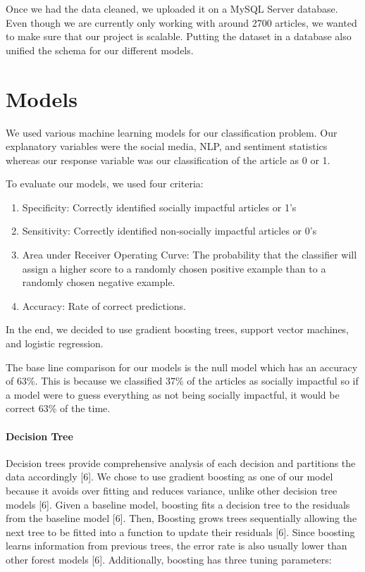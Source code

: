 \documentclass[10pt,letterpaper]{article}
\providecommand{\tightlist}{%
  \setlength{\itemsep}{0pt}\setlength{\parskip}{0pt}}
\begin{document}
Once we had the data cleaned, we uploaded it on a MySQL Server database.
Even though we are currently only working with around 2700 articles, we
wanted to make sure that our project is scalable. Putting the dataset in
a database also unified the schema for our different models.

\hypertarget{models}{%
\section{Models}\label{models}}

We used various machine learning models for our classification problem.
Our explanatory variables were the social media, NLP, and sentiment
statistics whereas our response variable was our classification of the
article as 0 or 1.

To evaluate our models, we used four criteria:

\begin{enumerate}
\def\labelenumi{\arabic{enumi}.}
\tightlist
\item
  Specificity: Correctly identified socially impactful articles or 1's
\item
  Sensitivity: Correctly identified non-socially impactful articles or
  0's
\item
  Area under Receiver Operating Curve: The probability that the
  classifier will assign a higher score to a randomly chosen positive
  example than to a randomly chosen negative example.
\item
  Accuracy: Rate of correct predictions.
\end{enumerate}

In the end, we decided to use gradient boosting trees, support vector
machines, and logistic regression.

The base line comparison for our models is the null model which has an
accuracy of 63\%. This is because we classified 37\% of the articles as
socially impactful so if a model were to guess everything as not being
socially impactful, it would be correct 63\% of the time.

\hypertarget{decision-tree}{%
\paragraph{Decision Tree}\label{decision-tree}}

Decision trees provide comprehensive analysis of each decision and
partitions the data accordingly {[}6{]}. We chose to use gradient
boosting as one of our model because it avoids over fitting and reduces
variance, unlike other decision tree models {[}6{]}. Given a baseline
model, boosting fits a decision tree to the residuals from the baseline
model {[}6{]}. Then, Boosting grows trees sequentially allowing the next
tree to be fitted into a function to update their residuals {[}6{]}.
Since boosting learns information from previous trees, the error rate is
also usually lower than other forest models {[}6{]}. Additionally,
boosting has three tuning parameters:
\end{document}

